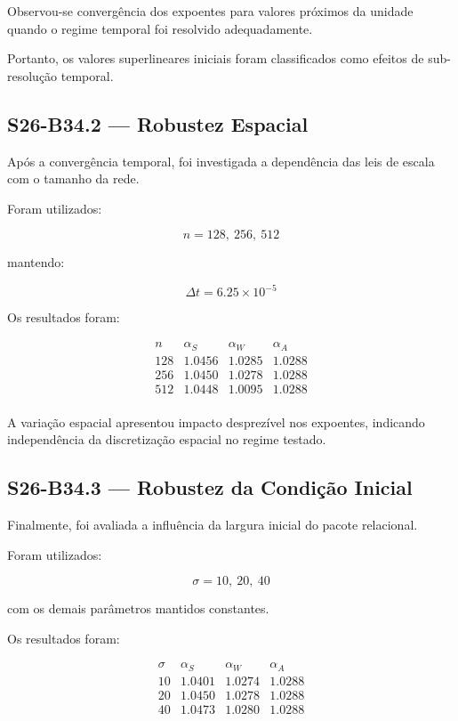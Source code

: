 \documentclass[11pt,a4paper]{article}
\begin{document}
Observou-se convergência dos expoentes para valores próximos da
unidade quando o regime temporal foi resolvido adequadamente.

Portanto, os valores superlineares iniciais foram classificados
como efeitos de sub-resolução temporal.


\subsection{S26-B34.2 — Robustez Espacial}

Após a convergência temporal, foi investigada a dependência das
leis de escala com o tamanho da rede.

Foram utilizados:

\[
n=128,\ 256,\ 512
\]

mantendo:

\[
\Delta t=6.25\times10^{-5}
\]

Os resultados foram:

\[
\begin{array}{c|ccc}
n &
\alpha_S &
\alpha_W &
\alpha_A
\\
\hline

128 &
1.0456 &
1.0285 &
1.0288
\\

256 &
1.0450 &
1.0278 &
1.0288
\\

512 &
1.0448 &
1.0095 &
1.0288
\\

\end{array}
\]

A variação espacial apresentou impacto desprezível nos expoentes,
indicando independência da discretização espacial no regime testado.


\subsection{S26-B34.3 — Robustez da Condição Inicial}

Finalmente, foi avaliada a influência da largura inicial do pacote
relacional.

Foram utilizados:

\[
\sigma=10,\ 20,\ 40
\]

com os demais parâmetros mantidos constantes.

Os resultados foram:

\[
\begin{array}{c|ccc}
\sigma &
\alpha_S &
\alpha_W &
\alpha_A
\\
\hline

10 &
1.0401 &
1.0274 &
1.0288
\\

20 &
1.0450 &
1.0278 &
1.0288
\\

40 &
1.0473 &
1.0280 &
1.0288
\\

\end{array}
\]
\end{document}
